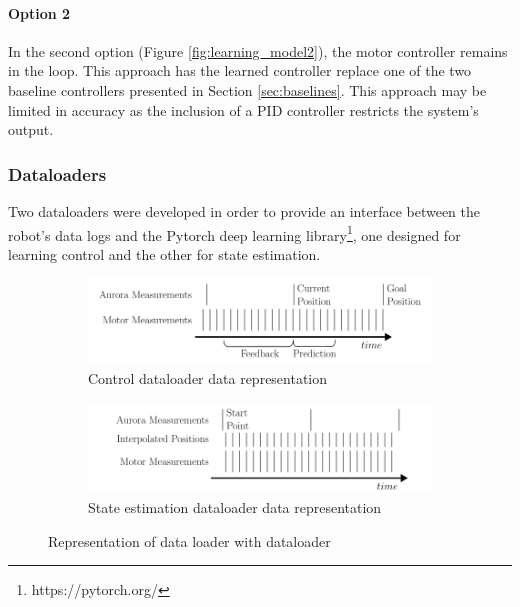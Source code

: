 \paragraph{Option 2}
In the second option (Figure \ref{fig:learning_model2}), the motor controller remains in the loop. This approach has the learned controller replace one of the two baseline controllers presented in Section \ref{sec:baselines}.  This approach may be limited in accuracy as the inclusion of a PID controller restricts the system's output. 

\subsubsection{Dataloaders}
Two dataloaders were developed in order to provide an interface between the robot's data logs and the Pytorch deep learning library\footnote{https://pytorch.org/}, one designed for learning control and the other for state estimation.

\begin{figure}[H]
     \centering
     \begin{subfigure}[b]{0.8\textwidth}
         \centering
         \includegraphics[width=\textwidth]{images/dataloader1.png}
         \caption{Control dataloader data representation}
         \label{fig:dataloader1}
     \end{subfigure}
     \hfill
     \begin{subfigure}[b]{0.8\textwidth}
         \centering
         \includegraphics[width=\textwidth]{images/dataloader2.png}
         \caption{State estimation dataloader data representation}
         \label{fig:dataloader2}
     \end{subfigure}
        \caption{Representation of data loader with dataloader}
        \label{fig:dataloaders}
\end{figure}

